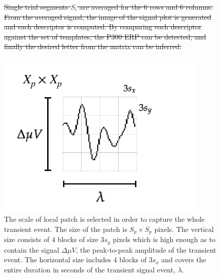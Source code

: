 \documentclass[utf8]{frontiersSCNS} %
\providecommand{\DIFaddtex}[1]{{\protect\color{blue}\uwave{#1}}} %
\providecommand{\DIFdeltex}[1]{{\protect\color{red}\sout{#1}}}                      %
\providecommand{\DIFaddFL}[1]{\DIFadd{#1}} %
\providecommand{\DIFdelFL}[1]{\DIFdel{#1}} %
\providecommand{\DIFaddbeginFL}{} %
\providecommand{\DIFaddendFL}{} %
\providecommand{\DIFdelbeginFL}{} %
\providecommand{\DIFdelendFL}{} %
\providecommand{\DIFadd}[1]{\texorpdfstring{\DIFaddtex{#1}}{#1}} %
\providecommand{\DIFdel}[1]{\texorpdfstring{\DIFdeltex{#1}}{}} %
\begin{document}
\begin{figure}[h!]
\centering
\DIFdelbeginFL %
\DIFdelFL{Single trial segments $S_i$ are averaged for the 6 rows and 6 columns. From the averaged signal, the image of the signal plot is generated and each descriptor is computed.  By comparing each descriptor against the set of templates, the P300 ERP can be detected, and finally the desired letter from the matrix can be inferred.}%

\DIFdelendFL \includegraphics[width=10cm]{patchgeometry.pdf}
\caption{The scale of local patch is selected in order to capture the whole transient event.  The size of the patch is \DIFdelbeginFL \DIFdelFL{$S_p \times S_p$ }\DIFdelendFL \DIFaddbeginFL \DIFaddFL{$X_p \times X_p$ }\DIFaddendFL pixels. The vertical size consists of $4$ blocks of size $3 s_y$ pixels which is high enough as to contain the signal $\Delta  \mu V $, the peak-to-peak amplitude of the transient event. The horizontal size includes $4$ blocks  of $3 s_x$ and covers the entire duration in seconds of the transient signal event, $ \lambda $.   }
\label{fig:patchgeometry}
\end{figure}
\end{document}
